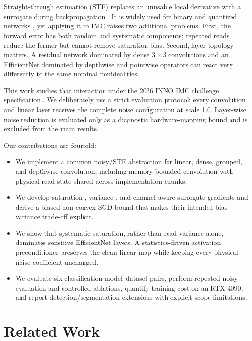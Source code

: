 \documentclass[10pt,twocolumn,letterpaper]{article}
\begin{document}
Straight-through estimation (STE) replaces an unusable local derivative with a
surrogate during backpropagation \citep{bengio2013estimating}.  It is widely
used for binary and quantized networks
\citep{courbariaux2015binaryconnect,hubara2016binarized,yin2019understanding},
yet applying it to IMC raises two additional problems.  First, the forward error
has both random and systematic components; repeated reads reduce the former but
cannot remove saturation bias.  Second, layer topology matters.  A residual
network dominated by dense $3\!\times\!3$ convolutions and an EfficientNet
dominated by depthwise and pointwise operators can react very differently to
the same nominal nonidealities.

This work studies that interaction under the 2026 INNO IMC challenge
specification \citep{inno2026challenge}.  We deliberately use a strict
evaluation protocol: every convolution and linear layer receives the complete
noise configuration at scale 1.0.  Layer-wise noise reduction is evaluated
only as a diagnostic hardware-mapping bound and is excluded from the main
results.

Our contributions are fourfold:
\begin{itemize}
  \item We implement a common noisy/STE abstraction for linear, dense,
  grouped, and depthwise convolution, including memory-bounded convolution with
  physical read state shared across implementation chunks.
  \item We develop saturation-, variance-, and channel-aware surrogate
  gradients and derive a biased non-convex SGD bound that makes their intended
  bias--variance trade-off explicit.
  \item We show that systematic saturation, rather than read variance alone,
  dominates sensitive EfficientNet layers.  A statistics-driven activation
  preconditioner preserves the clean linear map while keeping every physical
  noise coefficient unchanged.
  \item We evaluate six classification model--dataset pairs, perform repeated
  noisy evaluation and controlled ablations, quantify training cost on an RTX
  4090, and report detection/segmentation extensions with explicit scope
  limitations.
\end{itemize}

\section{Related Work}
\label{sec:related}
\end{document}
